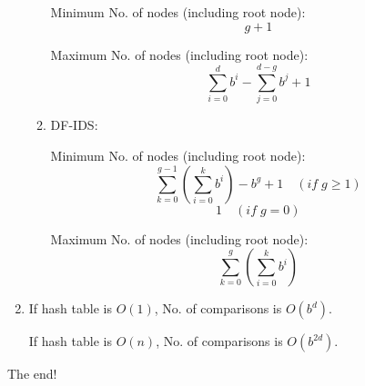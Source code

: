 \documentclass{article}
\begin{document}
\begin{enumerate}
\begin{enumerate}
  Minimum No. of nodes (including root node): $$g+1$$

  Maximum No. of nodes (including root node): $$\sum_{i=0}^d b^i - \sum_{j=0}^{d-g} b^j + 1$$

\item DF-IDS:

  Minimum No. of nodes (including root node): 
  $$\sum_{k=0}^{g-1} (\sum_{i=0}^k b^i) - b^g + 1 \quad (if\;g\geqslant 1)$$
  $$1\quad (if\;g=0)$$

  Maximum No. of nodes (including root node):
  $$\sum_{k=0}^g (\sum_{i=0}^k b^i)$$


\end{enumerate}



\item

If hash table is $O(1)$, No. of comparisons is $O(b^d)$.

If hash table is $O(n)$, No. of comparisons is $O(b^{2d})$.


\end{enumerate}


The end!


\end{document}
